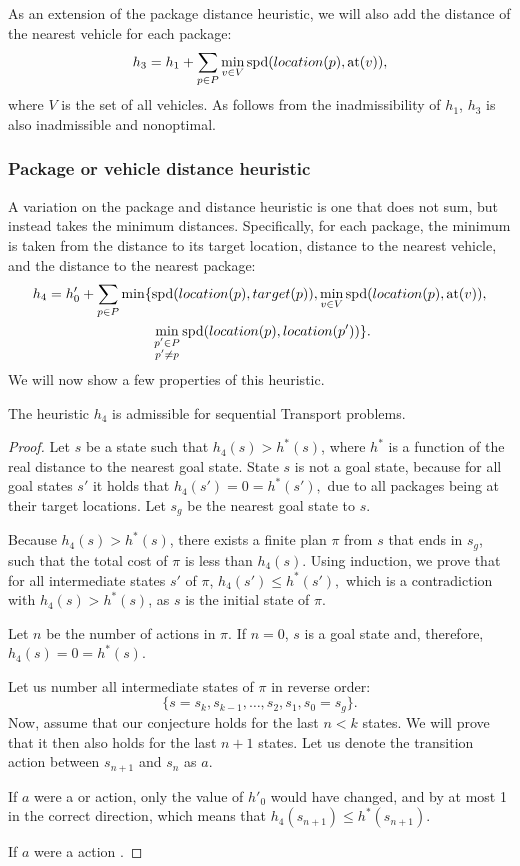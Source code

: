 As an extension of the package distance heuristic,
we will also add the distance of the nearest vehicle for
each package:
$$h_3 = h_1 + \sum_{p \in P} \min_{v \in V} \textrm{spd}(location(p), \textrm{at}(v)),$$
where $V$ is the set of all vehicles.
As follows from the inadmissibility of $h_1$, $h_3$
is also inadmissible and nonoptimal.

\subsubsection{Package or vehicle distance heuristic}\label{sfa4}

A variation on the package and distance heuristic
is one that does not sum, but instead takes
the minimum distances.
Specifically, for each package, the minimum
is taken from the distance to its target location,
distance to the nearest vehicle,
and the distance to the nearest package:
\begin{align*}
h_4 = h'_0 + \sum_{p \in P} \min\lbrace
&\textrm{spd}(location(p), target(p)),
\min_{v \in V} \textrm{spd}(location(p), \textrm{at}(v)),\\
&\min_{\substack{p' \in P\\p' \neq p}} \textrm{spd}(location(p), location(p'))\rbrace.
\end{align*}
We will now show a few properties of this heuristic.
\begin{thm}
The heuristic $h_4$ is admissible for sequential Transport problems.
\end{thm}
\begin{proof}
Let $s$ be a state such that $h_4(s) > h^*(s)$,
where $h^*$ is a function of the real distance to the nearest goal state.
State $s$ is not a goal state, because for all goal states $s'$
it holds that
$h_4(s') = 0 = h^*(s'),$ due to all packages being at their target locations.
Let $s_g$ be the nearest goal state to $s$.

Because $h_4(s) > h^*(s)$, there exists a finite plan $\pi$ from $s$ that ends in $s_g$,
such that the total cost of $\pi$ is less than $h_4(s)$.
Using induction, we prove that for all intermediate states $s'$ of $\pi$,
$h_4(s') \leq h^*(s'),$ which is a contradiction with $h_4(s) > h^*(s)$,
as $s$ is the initial state of $\pi$.

Let $n$ be the number of actions in $\pi$.
If $n=0$, $s$ is a goal state and, therefore, $h_4(s) = 0 = h^*(s)$.

Let us number all intermediate states of $\pi$ in reverse order: $$\{s = s_k, s_{k-1}, \ldots, s_2, s_1, s_0 = s_g\}.$$
Now, assume that our conjecture holds for the last $n < k$ states.
We will prove that it then also holds for the last $n+1$ states.
Let us denote the transition action between $s_{n+1}$ and $s_{n}$ as $a$.

If $a$ were a \pickup{} or \drop{} action, only the value of $h'_0$
would have changed, and by at most 1 in the correct direction,
which means that $h_4(s_{n+1}) \leq h^*(s_{n+1}).$

If $a$ were a \drive{} action
.
\end{proof}

